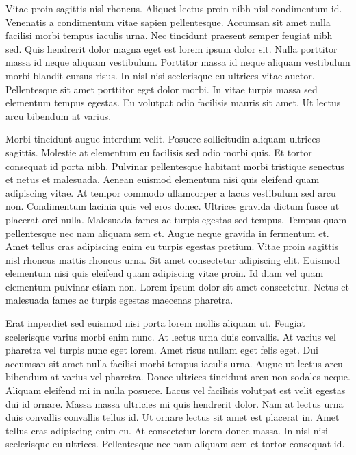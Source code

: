 \documentclass[11pt,a4paper]{article}
\begin{document}
Vitae proin sagittis nisl rhoncus. Aliquet lectus proin nibh nisl condimentum id. Venenatis a condimentum vitae sapien pellentesque. Accumsan sit amet nulla facilisi morbi tempus iaculis urna. Nec tincidunt praesent semper feugiat nibh sed. Quis hendrerit dolor magna eget est lorem ipsum dolor sit. Nulla porttitor massa id neque aliquam vestibulum. Porttitor massa id neque aliquam vestibulum morbi blandit cursus risus. In nisl nisi scelerisque eu ultrices vitae auctor. Pellentesque sit amet porttitor eget dolor morbi. In vitae turpis massa sed elementum tempus egestas. Eu volutpat odio facilisis mauris sit amet. Ut lectus arcu bibendum at varius.

Morbi tincidunt augue interdum velit. Posuere sollicitudin aliquam ultrices sagittis. Molestie at elementum eu facilisis sed odio morbi quis. Et tortor consequat id porta nibh. Pulvinar pellentesque habitant morbi tristique senectus et netus et malesuada. Aenean euismod elementum nisi quis eleifend quam adipiscing vitae. At tempor commodo ullamcorper a lacus vestibulum sed arcu non. Condimentum lacinia quis vel eros donec. Ultrices gravida dictum fusce ut placerat orci nulla. Malesuada fames ac turpis egestas sed tempus. Tempus quam pellentesque nec nam aliquam sem et. Augue neque gravida in fermentum et. Amet tellus cras adipiscing enim eu turpis egestas pretium. Vitae proin sagittis nisl rhoncus mattis rhoncus urna. Sit amet consectetur adipiscing elit. Euismod elementum nisi quis eleifend quam adipiscing vitae proin. Id diam vel quam elementum pulvinar etiam non. Lorem ipsum dolor sit amet consectetur. Netus et malesuada fames ac turpis egestas maecenas pharetra.

Erat imperdiet sed euismod nisi porta lorem mollis aliquam ut. Feugiat scelerisque varius morbi enim nunc. At lectus urna duis convallis. At varius vel pharetra vel turpis nunc eget lorem. Amet risus nullam eget felis eget. Dui accumsan sit amet nulla facilisi morbi tempus iaculis urna. Augue ut lectus arcu bibendum at varius vel pharetra. Donec ultrices tincidunt arcu non sodales neque. Aliquam eleifend mi in nulla posuere. Lacus vel facilisis volutpat est velit egestas dui id ornare. Massa massa ultricies mi quis hendrerit dolor. Nam at lectus urna duis convallis convallis tellus id. Ut ornare lectus sit amet est placerat in. Amet tellus cras adipiscing enim eu. At consectetur lorem donec massa. In nisl nisi scelerisque eu ultrices. Pellentesque nec nam aliquam sem et tortor consequat id.
\end{document}
